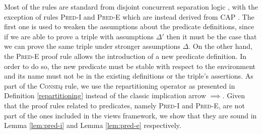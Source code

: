 Most of the rules are standard from disjoint concurrent separation logic \cite{csl}, with the exception of rules \textsc{Pred-I} and \textsc{Pred-E} which are instead derived from CAP \cite{cap}. The first one is used to weaken the assumptions about the predicate definitions, since if we are able to prove a triple with assumptions $\Delta'$ then it must be the case that we can prove the same triple under stronger assumptions $\Delta$. On the other hand, the \textsc{Pred-E} proof rule allows the introduction of a new predicate definition. In order to do so, the new predicate must be stable with respect to the environment and its name must not be in the existing definitions or the triple's assertions. As part of the \textsc{Conseq} rule, we use the repartitioning operator as presented in Definition \ref{repartitioning} instead of the classic implication arrow $\implies$. Given that the proof rules related to predicates, namely \textsc{Pred-I} and \textsc{Pred-E}, are not part of the ones included in the views framework, we show that they are sound in Lemma \ref{lem:pred-i} and Lemma \ref{lem:pred-e} respectively.